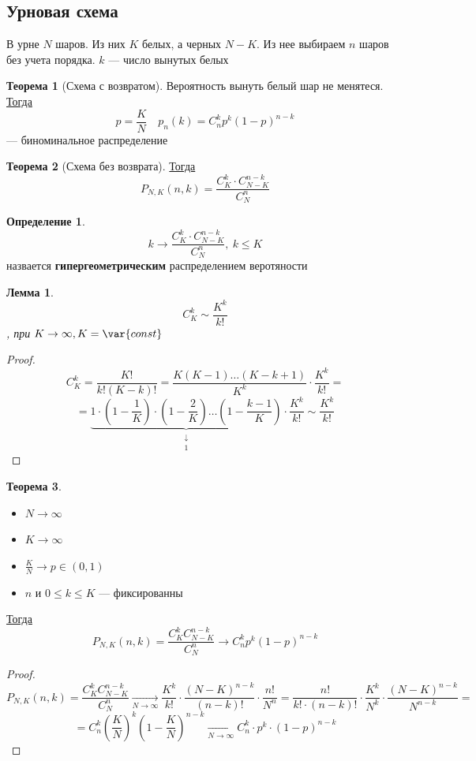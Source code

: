 \documentclass[oneside]{book}
\newcommand{\const}{\var{const}}
\theoremstyle{plain}
\newtheorem{lemma}{Лемма}
\theoremstyle{remark}
\theoremstyle{definition}
\newtheorem{theorem}{Теорема}[section]
\newtheorem*{definition}{Определение}
\begin{document}
\subsection{Урновая схема}
\label{sec:org5243694}
В урне \(N\) шаров. Из них \(K\) белых, а черных \(N - K\). Из нее выбираем \(n\) шаров без учета порядка. \(k\) --- число вынутых белых
\begin{theorem}[Схема с возвратом]
Вероятность вынуть белый шар не менятеся. \\
\uline{Тогда} \[ p = \frac{K}{N}\quad p_n(k) = C^k_np^k(1 - p)^{n - k} \]
--- биноминальное распределение
\end{theorem}
\begin{theorem}[Схема без возврата]
\uline{Тогда} \[ P_{N,K}(n, k) = \frac{C^k_K\cdot C^{n-k}_{N - K}}{C^n_N} \]
\end{theorem}
\begin{definition}
\[ k \to \frac{C^k_K\cdot C^{n - k}_{N - K}}{C^n_N},\ k \le K \]
назвается \textbf{гипергеометрическим} распределением веротяности
\end{definition}
\begin{lemma}
\[ C^k_K \sim \frac{K^k}{k!} \]
, при \(K \to \infty, K = \const\)
\end{lemma}
\begin{proof}
\[ C^k_K = \frac{K!}{k!(K - k)!} = \frac{K(K - 1)\dots(K - k + 1)}{K^k}\cdot \frac{K^k}{k!} = \]
\[ = \underbrace{1 \cdot \left(1 - \frac{1}{K}\right)\cdot\left(1 - \frac{2}{K}\right) \dots \left(1 - \frac{k - 1}{K}\right)}_{\substack{\downarrow \\ 1}} \cdot\frac{K^k}{k!} \sim \frac{K^k}{k!}\]
\end{proof}
\begin{theorem}
\-
\begin{itemize}
\item \(N \to \infty\)
\item \(K \to \infty\)
\item \(\frac{K}{N} \to p \in (0, 1)\)
\item \(n\) и \(0 \le k \le K\) --- фиксированны
\end{itemize}
\uline{Тогда} \[ P_{N,K}(n,k) = \frac{C^k_KC^{n - k}_{N - K}}{C^n_N} \to C^k_np^k(1 - p)^{n - k} \]
\end{theorem}
\begin{proof}
\[ P_{N, K}(n, k) = \frac{C^k_KC^{n - k}_{N - K}}{C^n_N} \xrightarrow[N \to \infty]{} \frac{K^k}{k!}\cdot \frac{(N -K)^{n - k}}{(n - k)!}\cdot \frac{n!}{N^n} = \frac{n!}{k!\cdot(n- k)!}\cdot \frac{K^k}{N^k}\cdot\frac{(N - K)^{n - k}}{N^{n - k}} = \]
\[ = C^k_n\left(\frac{K}{N}\right)^k\left(1 - \frac{K}{N}\right)^{n -k} \xrightarrow[N \to \infty]{} C^k_n\cdot p^k \cdot ( 1- p)^{n - k}\]
\end{proof}
\end{document}
